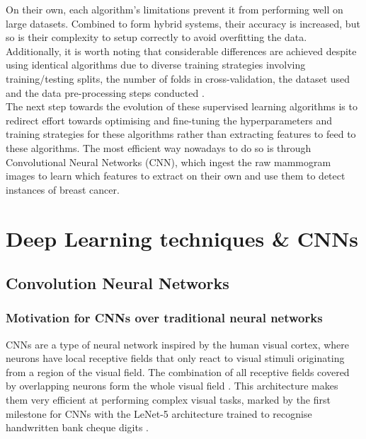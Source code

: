 On their own, each algorithm's limitations prevent it from performing well on large datasets. Combined to form hybrid systems, their accuracy is increased, but so is their complexity to setup correctly to avoid overfitting the data. Additionally, it is worth noting that considerable differences are achieved despite using identical algorithms due to diverse training strategies involving training/testing splits, the number of folds in cross-validation, the dataset used and the data pre-processing steps conducted \citep{Yue2018}.\\

The next step towards the evolution of these supervised learning algorithms is to redirect effort towards optimising and fine-tuning the hyperparameters and training strategies for these algorithms rather than extracting features to feed to these algorithms. The most efficient way nowadays to do so is through Convolutional Neural Networks (CNN), which ingest the raw mammogram images to learn which features to extract on their own and use them to detect instances of breast cancer.

% 


\section{Deep Learning techniques \& CNNs}
\label{sec:litsurvey-DLtechniques-CNN}

\subsection{Convolution Neural Networks}

\subsubsection{Motivation for CNNs over traditional neural networks}

CNNs are a type of neural network inspired by the human visual cortex, where neurons have local receptive fields that only react to visual stimuli originating from a region of the visual field. The combination of all receptive fields covered by overlapping neurons form the whole visual field \citep{Geron2019}. This architecture makes them very efficient at performing complex visual tasks, marked by the first milestone for CNNs with the LeNet-5 architecture trained to recognise handwritten bank cheque digits \citep{LeCun1998}.\\

